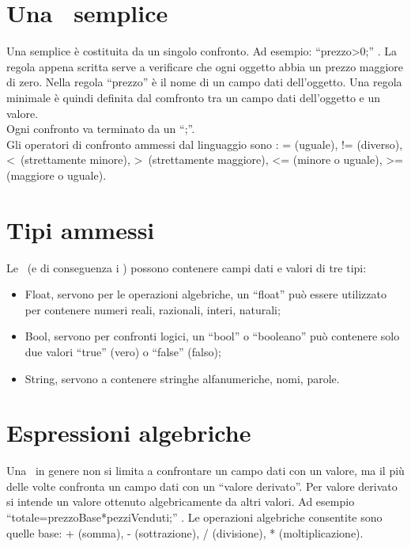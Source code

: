 \section{Una \br\ semplice}
Una \br semplice \`e costituita da un singolo confronto. Ad esempio: ``prezzo\textgreater0;'' . La regola appena scritta serve a verificare che ogni oggetto abbia un prezzo maggiore di zero. Nella regola ``prezzo'' \`e il nome di un campo dati dell'oggetto. Una regola minimale \`e quindi definita dal comfronto tra un campo dati dell'oggetto e un valore. \\
Ogni confronto va terminato da un ``;''. \\
Gli operatori di confronto ammessi dal linguaggio sono : = (uguale), != (diverso), \textless\ (strettamente minore), \textgreater\ (strettamente maggiore),  \textless= (minore o uguale), \textgreater= (maggiore o uguale).

\section{Tipi ammessi}
Le \br\ (e di conseguenza i \bo) possono contenere campi dati e valori di tre tipi:
\begin{itemize}
\item Float, servono per le operazioni algebriche, un ``float'' pu\`o essere utilizzato per contenere numeri reali, razionali, interi, naturali;
\item Bool, servono per confronti logici, un ``bool'' o ``booleano'' pu\`o contenere solo due valori ``true'' (vero) o ``false'' (falso);
\item String, servono a contenere stringhe alfanumeriche, nomi, parole.
\end{itemize}

\section{Espressioni algebriche}
Una \br\ in genere non si limita a confrontare un campo dati con un valore, ma il pi\`u delle volte confronta un campo dati con un ``valore derivato''. Per valore derivato si intende un valore ottenuto algebricamente da altri valori. Ad esempio ``totale=prezzoBase*pezziVenduti;'' . Le operazioni algebriche consentite sono quelle base: + (somma), - (sottrazione), / (divisione), * (moltiplicazione).


